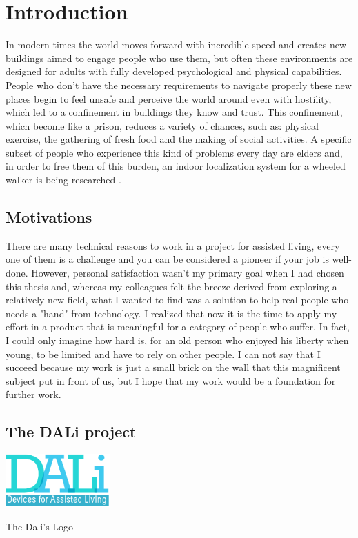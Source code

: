\chapter{Introduction}
In modern times the world moves forward with incredible speed and creates new buildings aimed to engage people who use them, but often these environments are designed for adults with fully developed psychological and physical capabilities.
People who don't have the necessary requirements to navigate properly these new places begin to feel unsafe and perceive the world around even with hostility, which led to a confinement in buildings they know and trust.
This confinement, which become like a prison, reduces a variety of chances, such as: physical exercise, the gathering of fresh food and the making of social activities.
A specific subset of people who experience this kind of problems every day are elders and, in order to free them of this burden, an indoor localization system for a wheeled walker is being researched . 

\section{Motivations}

There are many technical reasons to work in a project for assisted living, every one of them is a challenge and you can be considered a pioneer if your job is well-done.
However, personal satisfaction wasn't my primary goal when I had chosen this thesis and, whereas my colleagues felt the breeze derived from exploring a relatively new field, what I wanted to find was a solution to help real people who needs a "hand" from technology.
I realized that now it is the time to apply my effort in a product that is meaningful for a category of people who suffer. 
In fact, I could only imagine how hard is, for an old person who enjoyed his liberty when young, to be limited and have to rely on other people.
I can not say that I succeed because my work is just a small brick on the wall that this magnificent subject put in front of us, but I hope that my work would be a foundation for further work.

\section{The DALi project}

\vspace{1cm}
\begin{center}
      \includegraphics[width=0.3\textwidth]{img/Dali-logo.png}
      \caption{The Dali's Logo}
\end{center}
\vspace{1cm}

